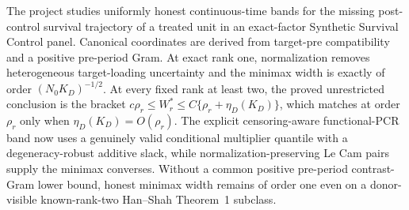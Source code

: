 The project studies uniformly honest continuous-time bands for the missing post-control survival trajectory of a treated unit in an exact-factor Synthetic Survival Control panel. Canonical coordinates are derived from target-pre compatibility and a positive pre-period Gram. At exact rank one, normalization removes heterogeneous target-loading uncertainty and the minimax width is exactly of order \((N_0K_D)^{-1/2}\). At every fixed rank at least two, the proved unrestricted conclusion is the bracket \(c\rho_r\le W_r^*\le C\{\rho_r+\eta_D(K_D)\}\), which matches at order \(\rho_r\) only when \(\eta_D(K_D)=O(\rho_r)\). The explicit censoring-aware functional-PCR band now uses a genuinely valid conditional multiplier quantile with a degeneracy-robust additive slack, while normalization-preserving Le Cam pairs supply the minimax converses. Without a common positive pre-period contrast-Gram lower bound, honest minimax width remains of order one even on a donor-visible known-rank-two Han--Shah Theorem~1 subclass.